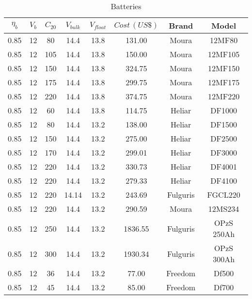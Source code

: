 \documentclass[journal,onecolumn]{IEEEtran}
\begin{document}
\begin{table}[h]
\renewcommand{\arraystretch}{1.3}
\caption{Batteries}\label{tab:battery}
\centering
\begin{scriptsize}
\begin{tabular}{c|c|c|c|c|c|c|c}
\hline
\hline
$\eta_{b}$  &  $V_{b}$  &  $C_{20}$  &  $V_{bulk}$  &  $V_{float}$  &  $Cost \, (US\$)$  &  Brand  &  Model \\
\hline
\hline
  0.85  &  12  &  80  &  14.4  &  13.8  &  131.00  &  Moura  &  12MF80  \\            
\hline
0.85 & 12 & 105 & 14.4 & 13.8 & 150.00 & Moura & 12MF105 \\
\hline
0.85 & 12 & 150 & 14.4 & 13.8 & 324.75 & Moura & 12MF150 \\
\hline
0.85 & 12 & 175 & 14.4 & 13.8 & 299.75 & Moura & 12MF175 \\
\hline
0.85 & 12 & 220 & 14.4 & 13.8 & 374.75 & Moura & 12MF220 \\
\hline
0.85 & 12 & 60 & 14.4 & 13.8 & 114.75 & Heliar & DF1000 \\     
\hline
0.85 & 12 & 80 & 14.4 & 13.2 & 138.00 & Heliar & DF1500 \\
\hline
0.85 & 12 & 150 & 14.4 & 13.2 & 275.00 & Heliar & DF2500 \\
\hline
0.85 & 12 & 170 & 14.4 & 13.2 & 299.01 & Heliar & DF3000 \\
\hline
0.85 & 12 & 220 & 14.4 & 13.2 & 330.73 & Heliar & DF4001 \\
\hline
0.85 & 12 & 220 & 14.4 & 13.2 & 279.33 & Heliar & DF4100 \\
\hline
0.85 & 12 & 220 & 14.14 & 13.2 & 243.69 & Fulguris & FGCL220 \\
\hline
0.85 & 12 & 220 & 14.4 & 13.2 & 290.59 & Moura & 12MS234 \\
\hline
0.85 & 12 & 250 & 14.4 & 13.2 & 1836.55 & Fulguris & OPzS 250Ah \\
\hline
0.85 & 12 & 300 & 14.4 & 13.2 & 1930.34 & Fulguris & OPzS 300Ah \\
\hline
0.85 & 12 & 36 & 14.4 & 13.2 & 77.00 & Freedom & Df500 \\
\hline
0.85 & 12 & 45 & 14.4 & 13.2 & 85.00 & Freedom & Df700 \\
\hline
\hline
\end{tabular}
\end{scriptsize}
\end{table}
\end{document}
